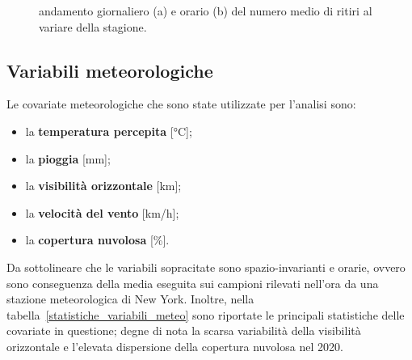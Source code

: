 \begin{figure}[htpb]
	\centering
	\quad
	\quad
	\caption[Andamento giornaliero e orario del numero medio di ritiri al variare della stagione]{andamento giornaliero (a) e orario (b) del numero medio di ritiri al variare della stagione.}
	\label{ritiri_giornalieri_orari}
\end{figure}

\subsection[Variabili meteorologiche]{Variabili meteorologiche}
Le covariate meteorologiche che sono state utilizzate per l'analisi sono:
\begin{itemize}
	\item la \textbf{temperatura percepita}  [\unit{\degreeCelsius}];
	\item la \textbf{pioggia} [\unit{\milli\meter}];
	\item la \textbf{visibilità orizzontale} [\unit{\kilo\meter}];
	\item la \textbf{velocità del vento} [\unit{\kilo\meter/\hour}];
	\item la \textbf{copertura nuvolosa} [\unit{\percent}].
\end{itemize}
Da sottolineare che le variabili sopracitate sono spazio-invarianti e orarie, ovvero sono conseguenza della media eseguita sui campioni rilevati nell'ora da una stazione meteorologica di New York. Inoltre, nella tabella~\ref{statistiche_variabili_meteo} sono riportate le principali statistiche delle covariate in questione; degne di nota la scarsa variabilità della visibilità orizzontale e l'elevata dispersione della copertura nuvolosa nel \num{2020}.

